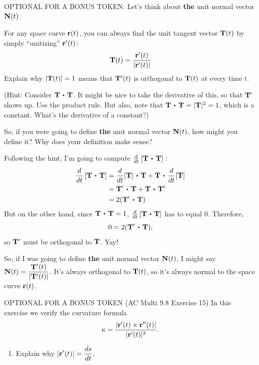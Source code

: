 \begin{enumerate}[leftmargin=0pt]
    \item OPTIONAL FOR A BONUS TOKEN: Let's think about \textbf{the} unit normal vector $\mathbf{N}(t)$. 
    
    For any space curve $\mathbf{r}(t)$, you can always find the unit tangent vector $\mathbf{T}(t)$ by simply ``unitizing'' $\mathbf{r}'(t)$:
    \[\mathbf{T}(t) = \frac{\mathbf{r}'(t)}{|\mathbf{r}'(t)|}\]
    Explain why $|\mathbf{T}(t)| = 1$ means that $\mathbf{T}'(t)$ is orthogonal to $\mathbf{T}(t)$ at every time $t$.
    
    (Hint: Consider $\vT \dotp \vT$. It might be nice to take the derivative of this, so that $\mathbf{T}'$ shows up. Use the product rule. But also, note that $\vT \dotp \vT = |\vT|^2 = 1$, which is a constant. What's the derivative of a constant?)
    
    So, if you were going to define \textbf{the} unit normal vector $\mathbf{N}(t)$, how might you define it? Why does your definition make sense?
    
    \begin{red}
        Following the hint, I'm going to compute $\frac{d}{dt} \left[ \vT \dotp \vT\right]:$
        \begin{align*}
            \frac{d}{dt} \left[ \vT \dotp \vT\right] &= 
            \frac{d}{dt}[\vT] \dotp \vT + \vT \dotp \frac{d}{dt}[\vT]\\
            &= \vT' \dotp \vT + \vT \dotp \vT' \\
            &= 2 (\vT' \dotp \vT)
        \end{align*}
        But on the other hand, since $\vT \dotp \vT = 1$, $\frac{d}{dt} \left[ \vT \dotp \vT\right]$ has to equal 0. Therefore, 
        \[0 = 2 (\vT' \dotp \vT),\]
        so $\mathbf{T}'$ must be orthogonal to $\mathbf{T}$. Yay!
        
        So, if I was going to define \textbf{the} unit normal vector $\mathbf{N}(t)$, I might say $\mathbf{N}(t) = \dfrac{\mathbf{T}'(t)}{|\mathbf{T}'(t)|}$. It's always orthogonal to $\mathbf{T}(t)$, so it's always normal to the space curve $\mathbf{r}(t)$.
    \end{red}
    
    {\everymath{\displaystyle}
    \item OPTIONAL FOR A BONUS TOKEN (AC Multi 9.8 Exercise 15) In this exercise we verify the curvature formula \[\kappa = \frac{\lvert \mathbf{r}'(t) \times \mathbf{r}''(t) \rvert}{\lvert \mathbf{r}'(t) \rvert^3}.\]
    \begin{enumerate}
        \item Explain why $\displaystyle \lvert \mathbf{r}'(t) \rvert = \frac{ds}{dt}.$
        

\end{enumerate}}
\end{enumerate}

